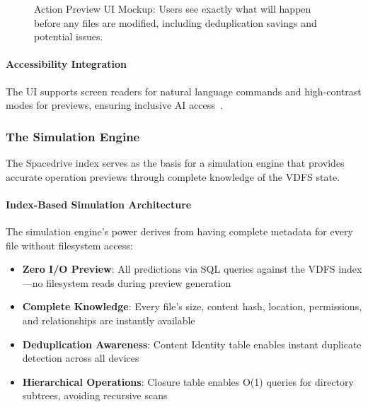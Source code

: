 \documentclass[sigconf]{acmart}
\begin{document}
\begin{figure}[ht!]
\caption{Action Preview UI Mockup: Users see exactly what will happen before any files are modified, including deduplication savings and potential issues.}
\label{fig:action-preview-ui}
\end{figure}

\paragraph{Accessibility Integration}
The UI supports screen readers for natural language commands and high-contrast modes for previews, ensuring inclusive AI access~\cite{wcag-2021}.

\subsubsection{The Simulation Engine}

The Spacedrive index serves as the basis for a simulation engine that provides accurate operation previews through complete knowledge of the VDFS state.

\paragraph{Index-Based Simulation Architecture}

The simulation engine's power derives from having complete metadata for every file without filesystem access:

\begin{itemize}[noitemsep, topsep=0pt]
 \item \textbf{Zero I/O Preview}: All predictions via SQL queries against the VDFS index—no filesystem reads during preview generation
 \item \textbf{Complete Knowledge}: Every file's size, content hash, location, permissions, and relationships are instantly available
 \item \textbf{Deduplication Awareness}: Content Identity table enables instant duplicate detection across all devices
 \item \textbf{Hierarchical Operations}: Closure table enables O(1) queries for directory subtrees, avoiding recursive scans
\end{itemize}
\end{document}
